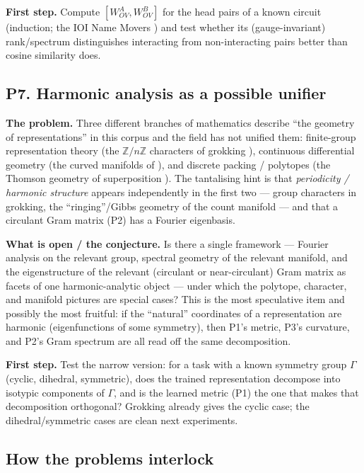 \textbf{First step.} Compute $[W_{OV}^{A},W_{OV}^{B}]$ for the head pairs of a known circuit
(induction; the IOI Name Movers \parencite{induction-heads,interpretability-in-the-wild-ioi}) and
test whether its (gauge-invariant) rank/spectrum distinguishes interacting from non-interacting
pairs better than cosine similarity does.

\subsection*{P7. Harmonic analysis as a possible unifier}

\textbf{The problem.} Three different branches of mathematics describe ``the geometry of
representations'' in this corpus and the field has not unified them: finite-group representation
theory (the $\mathbb{Z}/n\mathbb{Z}$ characters of grokking
\parencite{progress-measures-for-grokking}), continuous differential geometry (the curved
manifolds of \parencite{when-models-manipulate-manifolds-counting}), and discrete packing /
polytopes (the Thomson geometry of superposition \parencite{toy-models-superposition}). The
tantalising hint is that \emph{periodicity / harmonic structure} appears independently in the
first two --- group characters in grokking, the ``ringing''/Gibbs geometry of the count manifold
--- and that a circulant Gram matrix (P2) has a Fourier eigenbasis.

\textbf{What is open / the conjecture.} Is there a single framework --- Fourier analysis on the
relevant group, spectral geometry of the relevant manifold, and the eigenstructure of the relevant
(circulant or near-circulant) Gram matrix as facets of one harmonic-analytic object --- under
which the polytope, character, and manifold pictures are special cases? This is the most
speculative item and possibly the most fruitful: if the ``natural'' coordinates of a representation
are harmonic (eigenfunctions of some symmetry), then P1's metric, P3's curvature, and P2's Gram
spectrum are all read off the same decomposition.

\textbf{First step.} Test the narrow version: for a task with a known symmetry group $\Gamma$
(cyclic, dihedral, symmetric), does the trained representation decompose into isotypic components
of $\Gamma$, and is the learned metric (P1) the one that makes that decomposition orthogonal?
Grokking already gives the cyclic case; the dihedral/symmetric cases are clean next experiments.

\subsection*{How the problems interlock}

